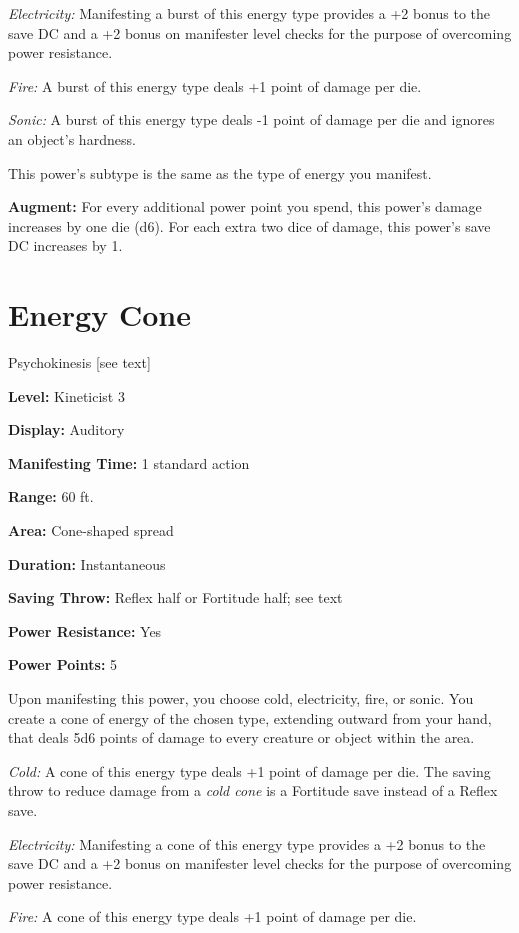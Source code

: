 \documentclass{article}
\begin{document}
\textit{Electricity: }Manifesting a burst of this energy type provides a +2 bonus 
to the save DC and a +2 bonus on manifester level checks for the purpose of overcoming 
power resistance.

\textit{Fire: }A burst of this energy type deals +1 point of damage per die. 

\textit{Sonic: }A burst of this energy type deals -1 point of damage per die and 
ignores an object's hardness.

This power's subtype is the same as the type of energy you manifest.

\textbf{Augment:} For every additional power point you spend, this power's damage 
increases by one die (d6). For each extra two dice of damage, this power's save 
DC increases by 1.

\vspace{12pt}
\section*{Energy Cone}

Psychokinesis [see text]

\textbf{Level:} Kineticist 3

\textbf{Display:} Auditory

\textbf{Manifesting Time:} 1 standard action

\textbf{Range:} 60 ft.

\textbf{Area:} Cone-shaped spread

\textbf{Duration:} Instantaneous

\textbf{Saving Throw:} Reflex half or Fortitude half; see text

\textbf{Power Resistance:} Yes

\textbf{Power Points:} 5

Upon manifesting this power, you choose cold, electricity, fire, or sonic. You 
create a cone of energy of the chosen type, extending outward from your hand, that 
deals 5d6 points of damage to every creature or object within the area.

\textit{Cold: }A cone of this energy type deals +1 point of damage per die. The 
saving throw to reduce damage from a \textit{cold cone }is a Fortitude save instead 
of a Reflex save.

\textit{Electricity: }Manifesting a cone of this energy type provides a +2 bonus 
to the save DC and a +2 bonus on manifester level checks for the purpose of overcoming 
power resistance.

\textit{Fire: }A cone of this energy type deals +1 point of damage per die.
\end{document}

